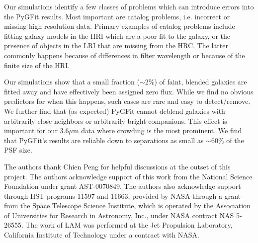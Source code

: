 \documentclass[apj]{emulateapj}
\newcommand{\pygfit}{PyGFit}
\begin{document}
Our simulations identify a few classes of problems which can introduce errors into the \pygfit{} results.  Most important are catalog problems, i.e. incorrect or missing high resolution data.  Primary examples of catalog problems include fitting galaxy models in the HRI which are a poor fit to the galaxy, or the presence of objects in the LRI that are missing from the HRC.  The latter commonly happens because of differences in filter wavelength or because of the finite size of the HRI.

Our simulations show that a small fraction ($\sim2\%$) of faint, blended galaxies are fitted away and have effectively been assigned zero flux.  While we find no obvious predictors for when this happens, such cases are rare and easy to detect/remove.  We further find that (as expected) \pygfit{} cannot deblend galaxies with arbitrarily close neighbors or arbitrarily bright companions.  This effect is important for our $3.6\mu$m data where crowding is the most prominent.  We find that \pygfit{}'s results are reliable down to separations as small as $\sim60\%$ of the PSF size.

\acknowledgements

The authors thank Chien Peng for helpful discussions at the outset of this project. The authors acknowledge support of this work from the National Science Foundation under grant AST-0070849.
The authors also acknowledge support through HST programs 11597 and 11663, 
provided by NASA through a grant from the Space Telescope
Science Institute, which is operated by the Association of
Universities for Research in Astronomy, Inc., under NASA
contract NAS 5-26555.
The work of LAM was performed at the Jet Propulsion Laboratory, California Institute of Technology under a contract with NASA.






\end{document}
